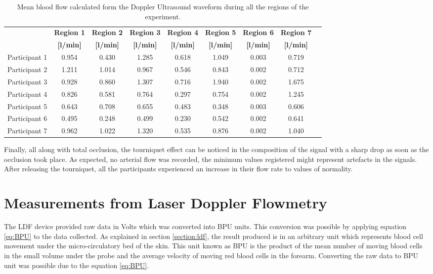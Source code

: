 \begin{table}[!htb]
	\caption{Mean blood flow calculated form the Doppler Ultrasound waveform during all the regions of the experiment.}
	\label{tbl:DU flow}
	\centering \small
	\begin{tabular}{p{1.9cm}cccccccc}
		\toprule
		& \textbf{Region 1}
		& \textbf{Region 2}
		& \textbf{Region 3}
		& \textbf{Region 4}
		& \textbf{Region 5}
		& \textbf{Region 6}
		& \textbf{Region 7} \\
		& \textbf{[\si[per-mode=symbol]{\litre\per\minute}]}
		& \textbf{[\si[per-mode=symbol]{\litre\per\minute}]}
		& \textbf{[\si[per-mode=symbol]{\litre\per\minute}]}
		& \textbf{[\si[per-mode=symbol]{\litre\per\minute}]}
		& \textbf{[\si[per-mode=symbol]{\litre\per\minute}]}
		& \textbf{[\si[per-mode=symbol]{\litre\per\minute}]}
		& \textbf{[\si[per-mode=symbol]{\litre\per\minute}]} \\\midrule	
		Participant 1 & 0.954 & 0.430 & 1.285 & 0.618 & 1.049 & 0.003 & 0.719 \\
		Participant 2 & 1.211 & 1.014 & 0.967 & 0.546 & 0.843 & 0.002 & 0.712 \\  
		Participant 3 & 0.928 & 0.860 & 1.307 & 0.716 & 1.940 & 0.002 & 1.675 \\  
		Participant 4 & 0.826 & 0.581 & 0.764 & 0.297 & 0.754 & 0.002 & 1.245 \\  
		Participant 5 & 0.643 & 0.708 & 0.655 & 0.483 & 0.348 & 0.003 & 0.606 \\  
		Participant 6 & 0.495 & 0.248 & 0.499 & 0.230 & 0.542 & 0.002 & 0.641 \\  
		Participant 7 & 0.962 & 1.022 & 1.320 & 0.535 & 0.876 & 0.002 & 1.040 \\  	 
		\bottomrule
	\end{tabular}
\end{table}

Finally, all along with total occlusion, the tourniquet effect can be noticed in the composition of the signal with a sharp drop as soon as the occlusion took place. As expected, no arterial flow was recorded, the minimum values registered might represent artefacts in the signals. After releasing the tourniquet, all the participants experienced an increase in their flow rate to values of normality. 

\section{Measurements from Laser Doppler Flowmetry}
\label{section comparison LDF}
The LDF device provided raw data in Volts which was converted into BPU units. This conversion was possible by applying equation \ref{eq:BPU} to the data collected. As explained in section \ref{section:ldf}, the result produced is in an arbitrary unit which represents blood cell movement under the micro-circulatory bed of the skin. This unit known as BPU is the product of the mean number of moving blood cells in the small volume under the probe and the average velocity of moving red blood cells in the forearm. Converting the raw data to BPU unit was possible due to the equation \ref{eq:BPU}.

